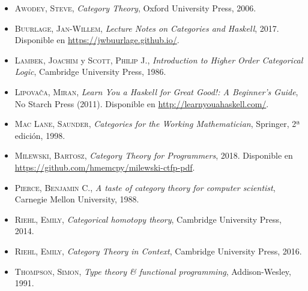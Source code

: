 \documentclass[12pt, twoside]{book}
\begin{document}
\begin{itemize}
  \setlength\itemsep{1em}
  \item \textsc{Awodey, Steve}, \emph{Category Theory}, Oxford University Press, 2006.
  \item \textsc{Buurlage, Jan-Willem}, \emph{Lecture Notes on Categories and Haskell}, 2017. Disponible en \url{https://jwbuurlage.github.io/}.
  \item \textsc{Lambek, Joachim} y \textsc{Scott, Philip J.}, \emph{Introduction to Higher Order Categorical Logic}, Cambridge University Press, 1986.
  \item \textsc{Lipovača, Miran}, \emph{Learn You a Haskell for Great Good!: A Beginner's Guide}, No Starch Press (2011). Disponible en \url{http://learnyouahaskell.com/}.
  \item \textsc{Mac Lane, Saunder}, \emph{Categories for the Working Mathematician}, Springer, 2ª edición, 1998.
  \item \textsc{Milewski, Bartosz}, \emph{Category Theory for Programmers}, 2018. Disponible en \url{https://github.com/hmemcpy/milewski-ctfp-pdf}.
  \item \textsc{Pierce, Benjamin C.}, \emph{A taste of category theory for computer scientist}, Carnegie Mellon University, 1988.
  \item \textsc{Riehl, Emily}, \emph{Categorical homotopy theory}, Cambridge University Press, 2014.
  \item \textsc{Riehl, Emily}, \emph{Category Theory in Context}, Cambridge University Press, 2016.
  \item \textsc{Thompson, Simon}, \emph{Type theory \& functional programming}, Addison-Wesley, 1991.
\end{itemize}

\printindex
\end{document}

